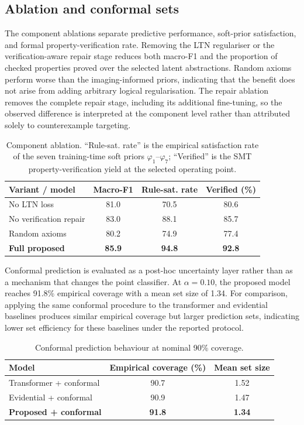 \documentclass[preprint,11pt]{elsarticle}
\begin{document}
\subsection{Ablation and conformal sets}
\label{subsec:ablation}

The component ablations separate predictive performance, soft-prior satisfaction, and formal property-verification rate. Removing the LTN regulariser or the verification-aware repair stage reduces both macro-F1 and the proportion of checked properties proved over the selected latent abstractions. Random axioms perform worse than the imaging-informed priors, indicating that the benefit does not arise from adding arbitrary logical regularisation. The repair ablation removes the complete repair stage, including its additional fine-tuning, so the observed difference is interpreted at the component level rather than attributed solely to counterexample targeting.

\begin{table}[H]
\centering
\caption{Component ablation. ``Rule-sat. rate'' is the empirical satisfaction rate of the seven training-time soft priors $\varphi_1$--$\varphi_7$; ``Verified'' is the SMT property-verification yield at the selected operating point.}
\label{tab:ablation_components}
\scriptsize
\begin{tabular}{lccc}
\toprule
\textbf{Variant / model} & \textbf{Macro-F1} & \textbf{Rule-sat. rate} & \textbf{Verified (\%)} \\
\midrule
No LTN loss & 81.0 & 70.5 & 80.6 \\
No verification repair & 83.0 & 88.1 & 85.7 \\
Random axioms & 80.2 & 74.9 & 77.4 \\
\textbf{Full proposed} & \textbf{85.9} & \textbf{94.8} & \textbf{92.8} \\
\bottomrule
\end{tabular}
\end{table}

Conformal prediction is evaluated as a post-hoc uncertainty layer rather than as a mechanism that changes the point classifier. At $\alpha=0.10$, the proposed model reaches 91.8\% empirical coverage with a mean set size of 1.34. For comparison, applying the same conformal procedure to the transformer and evidential baselines produces similar empirical coverage but larger prediction sets, indicating lower set efficiency for these baselines under the reported protocol.

\begin{table}[H]
\centering
\caption{Conformal prediction behaviour at nominal 90\% coverage.}
\label{tab:conformal_comparison}
\scriptsize
\begin{tabular}{lcc}
\toprule
\textbf{Model} & \textbf{Empirical coverage (\%)} & \textbf{Mean set size} \\
\midrule
Transformer + conformal & 90.7 & 1.52 \\
Evidential + conformal & 90.9 & 1.47 \\
\textbf{Proposed + conformal} & \textbf{91.8} & \textbf{1.34} \\
\bottomrule
\end{tabular}
\end{table}
\end{document}
